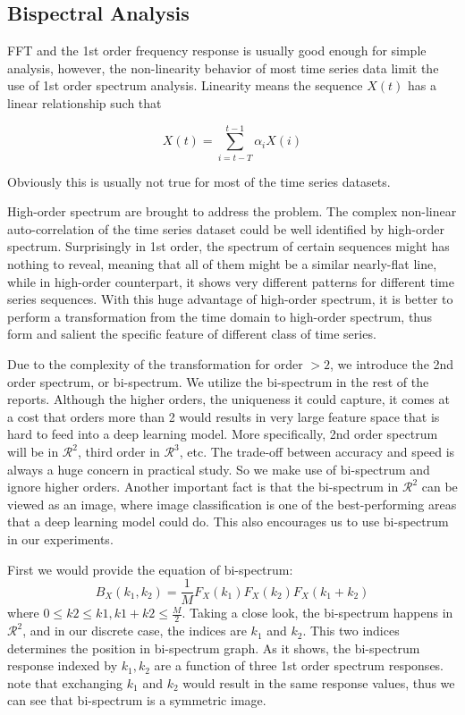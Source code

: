 \documentclass[letterpaper,12pt]{article}
\begin{document}
\subsection{Bispectral Analysis}
FFT and the 1st order frequency response is usually good enough for simple analysis, however, the non-linearity behavior of most time series data limit the use of 1st order spectrum analysis\cite{harvill2013bispectral}.
Linearity means the sequence $X(t)$ has a linear relationship such that

\begin{equation} \label{eq:linear} 
X(t) = \sum_{i=t-T}^{t-1} \alpha_i X(i)
\end{equation}

Obviously this is usually not true for most of the time series datasets.

High-order spectrum are brought to address the problem. The complex non-linear auto-correlation of the time series dataset could be well identified by high-order spectrum. Surprisingly in 1st order, the spectrum of certain sequences might has nothing to reveal, meaning that all of them might be a similar nearly-flat line, while in high-order counterpart, it shows very different patterns for different time series sequences. With this huge advantage of high-order spectrum, it is better to perform a transformation from the time domain to high-order spectrum, thus form and salient the specific feature of different class of time series.

Due to the complexity of the transformation for order $>2$, we introduce the 2nd order spectrum, or bi-spectrum. We utilize the bi-spectrum in the rest of the reports. Although the higher orders, the uniqueness it could capture, it comes at a cost that orders more than 2 would results in very large feature space that is hard to feed into a deep learning model. More specifically, 2nd order spectrum will be in $\mathcal{R}^2$, third order in $\mathcal{R}^3$, etc.
The trade-off between accuracy and speed is always a huge concern in practical study. So we make use of bi-spectrum and ignore higher orders.
Another important fact is that the bi-spectrum in $\mathcal{R}^2$ can be viewed as an image, where image classification is one of the best-performing areas that a deep learning model could do.
This also encourages us to use bi-spectrum in our experiments.

First we would provide the equation of bi-spectrum:
\begin{equation} \label{eq:bispect} 
B_{X}(k_1, k_2) = \frac{1}{M}F_{X}(k_1)F_{X}(k_2)F_{X}(k_1 + k_2)
\end{equation}
where $0 \leq k2 \leq k1, k1 + k2 \leq \frac{M}{2}$.
Taking a close look, the bi-spectrum happens in $\mathcal{R}^2$, and in our discrete case, the indices are $k_1$ and $k_2$. This two indices determines the position in bi-spectrum graph. As it shows, the bi-spectrum response indexed by $k_1,k_2$ are a function of three 1st order spectrum responses. note that exchanging $k_1$ and $k_2$ would result in the same response values, thus we can see that bi-spectrum is a symmetric image.
\end{document}
